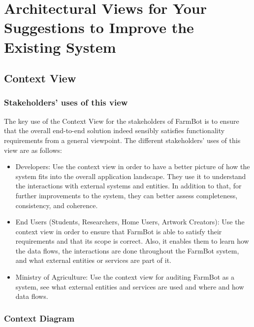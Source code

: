 \chapter{Architectural Views for Your Suggestions to Improve the Existing System} \label{suggest}


\section{Context View}


\subsection{Stakeholders’ uses of this view}

The key use of the Context View for the stakeholders of FarmBot is to ensure that the overall end-to-end solution indeed sensibly satisfies functionality requirements from a general viewpoint. The different stakeholders' uses of this view are as follows:
\begin{itemize}
    \item Developers: Use the context view in order to have a better picture of how the system fits into the overall application landscape. They use it to understand the interactions with external systems and entities. In addition to that, for further improvements to the system, they can better assess completeness, consistency, and coherence.
    \item End Users (Students, Researchers, Home Users, Artwork Creators): Use the context view in order to ensure that FarmBot is able to satisfy their requirements and that its scope is correct. Also, it enables them to learn how the data flows, the interactions are done throughout the FarmBot system, and what external entities or services are part of it.
    \item Ministry of Agriculture: Use the context view for auditing FarmBot as a system, see what external entities and services are used and where and how data flows.
\end{itemize}

\subsection{Context Diagram}


